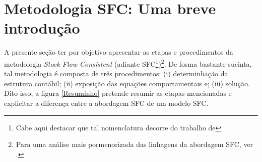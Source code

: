 \section{Metodologia SFC: Uma breve introdução}

A presente seção ter por objetivo apresentar as etapas e procedimentos da metodologia \textit{Stock Flow Consistent} (adiante SFC\footnote{Cabe aqui destacar que tal nomenclatura decorre do trabalho de })\footnote{Para uma análise mais pormenorizada das linhagens da abordagem SFC, ver \textcite{caverzasi_stock-flow_2013}.}. De forma bastante sucinta, tal metodologia é composta de três procedimentos: (i) determinhação da estrutura contábil; (ii) exposição das equações comportamentais e; (iii) solução. Dito isso, a figura \ref{Resuminho} pretende resumir as etapas mencionadas e explicitar a diferença entre a abordagem SFC de um modelo SFC. 

